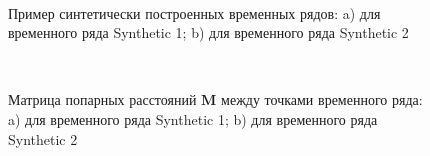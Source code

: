 \begin{figure}[h!t]\center
{}
\\
\caption{Пример синтетически построенных временных рядов: a) для временного ряда Synthetic 1; b) для временного ряда Synthetic 2}
\label{fig_synthetic_series}
\end{figure}

\begin{figure}[h!t]\center
{}
\\
\caption{Матрица попарных расстояний $\textbf{M}$ между точками временного ряда: a) для временного ряда Synthetic 1; b) для временного ряда Synthetic 2}
\label{fig_synthetic_distance}
\end{figure}


